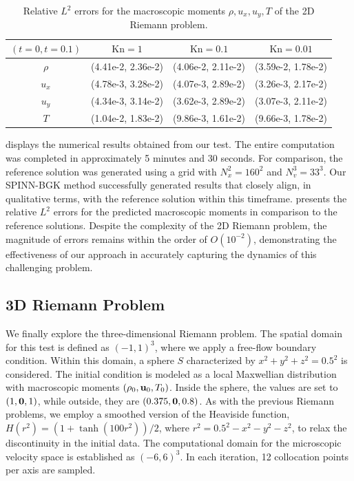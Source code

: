 \documentclass[preprint,12pt]{elsarticle}
\begin{document}
\begin{table}
\centering
\begin{tabular}{ |c|c|c|c| } 
 \hline
  $(t=0, t=0.1)$ & $\mathrm{Kn} = 1$ & $\mathrm{Kn} = 0.1$ & $\mathrm{Kn} = 0.01$ \\
  \hline
  $\rho$ & (4.41e-2, 2.36e-2) & (4.06e-2, 2.11e-2) & (3.59e-2, 1.78e-2) \\
  $u_x$ & (4.78e-3, 3.28e-2) & (4.07e-3, 2.89e-2) & (3.26e-3, 2.17e-2) \\
  $u_y$ & (4.34e-3, 3.14e-2) & (3.62e-3, 2.89e-2) & (3.07e-3, 2.11e-2) \\
  $T$ & (1.04e-2, 1.83e-2) & (9.86e-3, 1.61e-2) & (9.66e-3, 1.78e-2) \\
 \hline
\end{tabular}
\caption{Relative $L^2$ errors for the macroscopic moments $\rho, u_x, u_y, T$ of the 2D Riemann problem.}
\label{tab:2d_riemann}
\end{table}


 displays the numerical results obtained from our test.
The entire computation was completed in approximately 5 minutes and 30 seconds.
For comparison, the reference solution was generated using a grid with $N_x^2 = 160^2$ and $N_v^3 = 33^3$.
Our SPINN-BGK method successfully generated results that closely align, in qualitative terms, with the reference solution within this timeframe.
 presents the relative $L^2$ errors for the predicted macroscopic moments in comparison to the reference solutions.
Despite the complexity of the 2D Riemann problem, the magnitude of errors remains within the order of $O(10^{-2})$, demonstrating the effectiveness of our approach in accurately capturing the dynamics of this challenging problem.


\subsection{3D Riemann Problem}\label{sec:3d_riemann}
We finally explore the three-dimensional Riemann problem.
The spatial domain for this test is defined as $(-1, 1)^3$, where we apply a free-flow boundary condition.
Within this domain, a sphere $S$ characterized by $x^2 + y^2 + z^2 = 0.5^2$ is considered.
The initial condition is modeled as a local Maxwellian distribution with macroscopic moments $(\rho_0, {\bf u}_0, T_0)$.
Inside the sphere, the values are set to $(1, {\bf 0}, 1)$, while outside, they are $(0.375, {\bf 0}, 0.8)$.
As with the previous Riemann problems, we employ a smoothed version of the Heaviside function, $H(r^2) = (1+ \tanh(100r^2))/2$, where $r^2 = 0.5^2 - x^2 - y^2 - z^2$, to relax the discontinuity in the initial data.
The computational domain for the microscopic velocity space is established as $(-6, 6)^3$.
In each iteration, 12 collocation points per axis are sampled.
\end{document}
